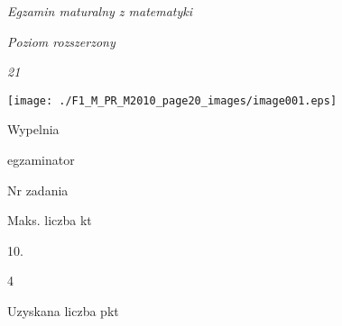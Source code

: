 \documentclass[a4paper,12pt]{article}
\begin{document}
{\it Egzamin maturalny z matematyki}

{\it Poziom rozszerzony}

{\it 21}
\begin{center}
\texttt{[image: ./F1\_M\_PR\_M2010\_page20\_images/image001.eps]}
\end{center}
Wypelnia

egzaminator

Nr zadania

Maks. liczba kt

10.

4

Uzyskana liczba pkt
\end{document}
